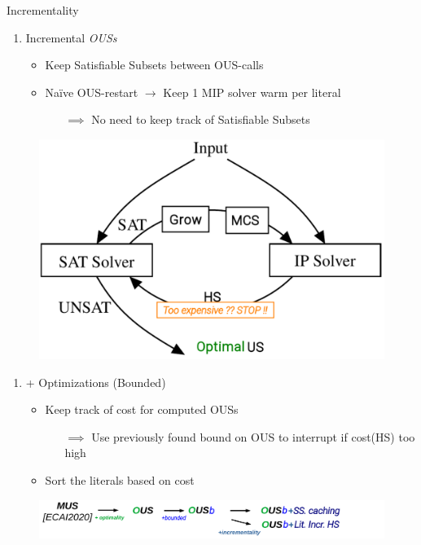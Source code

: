 \documentclass[handout]{beamer}
\begin{document}
	\begin{frame}{Incrementality}
	
	\begin{minipage}{0.59\textwidth}
		\begin{enumerate}
			\item {\color{vuborange} Incremental \emph{OUSs}}
			\begin{itemize}
				\item Keep Satisfiable Subsets between OUS-calls
				\item Naïve OUS-restart $\rightarrow$ Keep 1 MIP solver warm per literal
				\begin{itemize}
					\item[$\implies$] No need to keep track of Satisfiable Subsets
				\end{itemize}
			\end{itemize}	
		\end{enumerate}
	\end{minipage}
	\begin{minipage}{0.39\textwidth}
		\begin{figure}
			\includegraphics[width=\textwidth]{ihs_cost.png}
		\end{figure}
	\end{minipage}
	\begin{enumerate}
		\item {\color{vuborange} + Optimizations {\color{blue} (Bounded)}}
		\begin{itemize}
			\item Keep track of cost for computed OUSs 
			\begin{itemize}
				\item[$\implies$] Use previously found bound on OUS to interrupt if cost(HS) too high 
			\end{itemize}
			\item Sort the literals based on cost
		\end{itemize}
	\end{enumerate}
	
	\begin{figure}
		\includegraphics[width=\textwidth]{mus_to_ous_i_bounded.png}
	\end{figure}
\end{frame}
\end{document}
